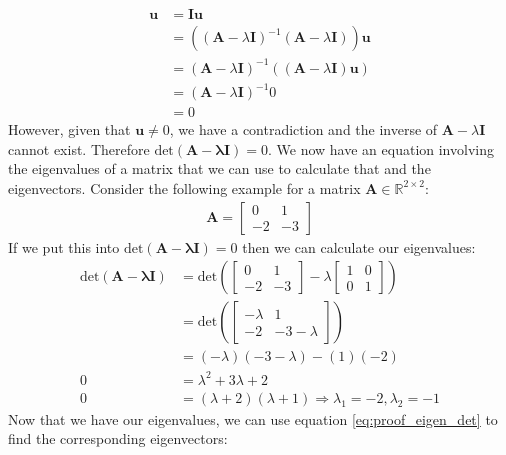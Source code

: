 \documentclass[a4paper,12pt]{article}
\newcommand{\matrx}[1]{\bm{#1}}
\newcommand{\vectr}[1]{\textbf{#1}}
\newcommand{\real}{\mathbb{R}}
\newcommand{\dett}[1]{\text{det}(\matrx{#1})}
\newcommand{\mdett}[1]{\text{det} \left ( #1 \right )}
\begin{document}
	\begin{align}
		\vectr{u} &= \matrx{I} \vectr{u} \\
		&= ((\matrx{A} - \lambda \matrx{I})^{-1} (\matrx{A} - \lambda \matrx{I})) \vectr{u} \\
		&= (\matrx{A} - \lambda \matrx{I})^{-1} ((\matrx{A} - \lambda \matrx{I}) \vectr{u}) \\
		&= (\matrx{A} - \lambda \matrx{I})^{-1} 0 \\
		&= 0
	\end{align}
	However, given that $ \vectr{u} \ne 0 $, we have a contradiction and the inverse of $ \matrx{A} - \lambda \matrx{I} $ cannot exist. Therefore $ \dett{\matrx{A} - \lambda \matrx{I}} = 0 $.
	We now have an equation involving the eigenvalues of a matrix that we can use to calculate that and the eigenvectors. Consider the following example for a matrix $ \matrx{A} \in \real^{2 \times 2} $:
	\begin{align}
		\matrx{A} = \begin{bmatrix}
			0 & 1 \\
			-2 & -3 
		\end{bmatrix}
		\label{eq:eigen_matrix_ex}
	\end{align}
	If we put this into $ \dett{\matrx{A} - \lambda \matrx{I}} = 0 $ then we can calculate our eigenvalues:
	\begin{align}
		\dett{\matrx{A} - \lambda \matrx{I}} &= \mdett{\begin{bmatrix}
				0 & 1 \\
				-2 & -3 
			\end{bmatrix} - \lambda \begin{bmatrix}
				1 & 0 \\
				0 & 1
		\end{bmatrix}} \\ &= \mdett{\begin{bmatrix}
				-\lambda & 1 \\
				-2 & -3 - \lambda
		\end{bmatrix}} \\
		&= (-\lambda)(-3-\lambda) - (1)(-2) \\
		\label{eq:char_det} 0 &= \lambda^{2} + 3\lambda + 2 \\
		0 &= (\lambda + 2)(\lambda + 1) \Rightarrow \lambda_1 = -2, \lambda_2 = -1
		\label{eq:eigen_eigenvalue_1_2_ex}
	\end{align}
	Now that we have our eigenvalues, we can use equation \ref{eq:proof_eigen_det} to find the corresponding eigenvectors:
\end{document}
